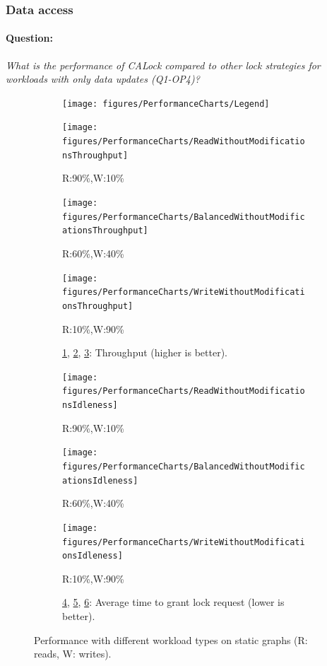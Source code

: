 \subsubsection{Data access} \label{benchmark:StaticOverallPerf}
\paragraph{Question:} \emph{What is the performance of CALock compared to other lock strategies for workloads with only data updates (Q1-OP4)?}


\begin{figure}
	\centering
	\captionsetup{justification=centering}
	\begin{subfigure}[b]{\textwidth}
		\centering
		\texttt{[image: figures/PerformanceCharts/Legend]}
	\end{subfigure}
	\begin{subfigure}{.33\textwidth}
		\texttt{[image: figures/PerformanceCharts/ReadWithoutModificationsThroughput]}
		\caption{R:90\%,W:10\%}
		\label{rwm}
	\end{subfigure}
	\begin{subfigure}{.32\textwidth}
		\texttt{[image: figures/PerformanceCharts/BalancedWithoutModificationsThroughput]}
		\caption{R:60\%,W:40\%}
		\label{bwm}
	\end{subfigure}
	\begin{subfigure}{.32\textwidth}
		\texttt{[image: figures/PerformanceCharts/WriteWithoutModificationsThroughput]}
		\caption{R:10\%,W:90\%}
		\label{wwm}
	\end{subfigure}
	\begin{subfigure}[b]{\textwidth}
		\caption*{\cref{rwm}, \cref{bwm}, \cref{wwm}: Throughput (higher is better).}
	\end{subfigure}


	\begin{subfigure}[b]{.33\textwidth}
		\texttt{[image: figures/PerformanceCharts/ReadWithoutModificationsIdleness]}
		\caption{R:90\%,W:10\%}
		\label{irwm}
	\end{subfigure}
	\begin{subfigure}[b]{.32\textwidth}
		\texttt{[image: figures/PerformanceCharts/BalancedWithoutModificationsIdleness]}
		\caption{R:60\%,W:40\%}
		\label{ibwm}
	\end{subfigure}
	\begin{subfigure}[b]{.32\textwidth}
		\texttt{[image: figures/PerformanceCharts/WriteWithoutModificationsIdleness]}
		\caption{R:10\%,W:90\%}
		\label{iwwm}
	\end{subfigure}
	\begin{subfigure}[b]{\textwidth}
		\caption*{\cref{irwm}, \cref{ibwm}, \cref{iwwm}: Average time to grant lock request (lower is better).}
	\end{subfigure}



	\caption{Performance with different workload types on static graphs (R: reads, W: writes).}
	\label{staticPerf}
	\end{figure}
